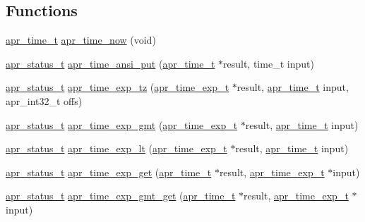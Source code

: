 \subsection*{Functions}
\begin{DoxyCompactItemize}
\item 
\hyperlink{group__apr__time_gadb4bde16055748190eae190c55aa02bb}{apr\-\_\-time\-\_\-t} \hyperlink{group__apr__time_gac5cb8713d0681d7b809169a222512287}{apr\-\_\-time\-\_\-now} (void)
\item 
\hyperlink{group__apr__errno_gaf76ee4543247e9fb3f3546203e590a6c}{apr\-\_\-status\-\_\-t} \hyperlink{group__apr__time_gac2fec71f18b4a286b2e21f0b74fadce8}{apr\-\_\-time\-\_\-ansi\-\_\-put} (\hyperlink{group__apr__time_gadb4bde16055748190eae190c55aa02bb}{apr\-\_\-time\-\_\-t} $\ast$result, time\-\_\-t input)
\item 
\hyperlink{group__apr__errno_gaf76ee4543247e9fb3f3546203e590a6c}{apr\-\_\-status\-\_\-t} \hyperlink{group__apr__time_gaaf3b8ba123feaa0af5a5975b9a8ab8b1}{apr\-\_\-time\-\_\-exp\-\_\-tz} (\hyperlink{structapr__time__exp__t}{apr\-\_\-time\-\_\-exp\-\_\-t} $\ast$result, \hyperlink{group__apr__time_gadb4bde16055748190eae190c55aa02bb}{apr\-\_\-time\-\_\-t} input, apr\-\_\-int32\-\_\-t offs)
\item 
\hyperlink{group__apr__errno_gaf76ee4543247e9fb3f3546203e590a6c}{apr\-\_\-status\-\_\-t} \hyperlink{group__apr__time_gafa8bdd3a4500f66866d8dd54bf69fb71}{apr\-\_\-time\-\_\-exp\-\_\-gmt} (\hyperlink{structapr__time__exp__t}{apr\-\_\-time\-\_\-exp\-\_\-t} $\ast$result, \hyperlink{group__apr__time_gadb4bde16055748190eae190c55aa02bb}{apr\-\_\-time\-\_\-t} input)
\item 
\hyperlink{group__apr__errno_gaf76ee4543247e9fb3f3546203e590a6c}{apr\-\_\-status\-\_\-t} \hyperlink{group__apr__time_ga34d3b9858de1d3111a4b2ff936ada7f6}{apr\-\_\-time\-\_\-exp\-\_\-lt} (\hyperlink{structapr__time__exp__t}{apr\-\_\-time\-\_\-exp\-\_\-t} $\ast$result, \hyperlink{group__apr__time_gadb4bde16055748190eae190c55aa02bb}{apr\-\_\-time\-\_\-t} input)
\item 
\hyperlink{group__apr__errno_gaf76ee4543247e9fb3f3546203e590a6c}{apr\-\_\-status\-\_\-t} \hyperlink{group__apr__time_gac13166685922464d9848bda469e0b3b7}{apr\-\_\-time\-\_\-exp\-\_\-get} (\hyperlink{group__apr__time_gadb4bde16055748190eae190c55aa02bb}{apr\-\_\-time\-\_\-t} $\ast$result, \hyperlink{structapr__time__exp__t}{apr\-\_\-time\-\_\-exp\-\_\-t} $\ast$input)
\item 
\hyperlink{group__apr__errno_gaf76ee4543247e9fb3f3546203e590a6c}{apr\-\_\-status\-\_\-t} \hyperlink{group__apr__time_ga0f9fdeae48a45662cb3f198d06c743f0}{apr\-\_\-time\-\_\-exp\-\_\-gmt\-\_\-get} (\hyperlink{group__apr__time_gadb4bde16055748190eae190c55aa02bb}{apr\-\_\-time\-\_\-t} $\ast$result, \hyperlink{structapr__time__exp__t}{apr\-\_\-time\-\_\-exp\-\_\-t} $\ast$input)

\end{DoxyCompactItemize}
